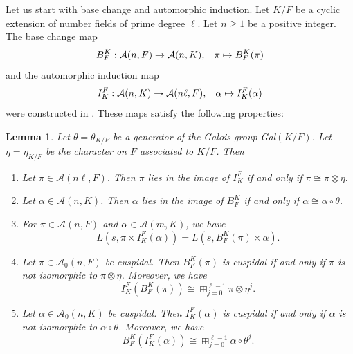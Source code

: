 \documentclass[12pt]{amsart}
\newcommand{\cA}{\mathcal{A}}
\newtheorem{lemma}{Lemma}[section]
\begin{document}
Let us start with base change and automorphic induction. Let $K/F$ be a cyclic extension of number fields of prime degree $\ell$. Let $n \geq 1$ be a positive integer. The base change map 
\begin{equation*}
    B_F^K:\cA(n,F) \to \cA(n,K), \hspace{3mm} \pi \mapsto B_F^K(\pi)
\end{equation*}
and the automorphic induction map 
\begin{equation*}
    I_K^F:\cA(n,K) \to \cA(n\ell,F), \hspace{3mm} \alpha \mapsto I_K^F(\alpha)
\end{equation*}
were constructed in \cite{ArthurClozel1989}. These maps satisfy the following properties: 

\begin{lemma}\label{base change and automporphic induction}
    Let $\theta = \theta_{K/F}$ be a generator of the Galois group Gal$(K/F)$. Let $\eta = \eta_{K/F}$ be the character on $F$ associated to $K/F$. Then 
    \begin{enumerate}
        \item Let $\pi \in \cA(n\ell,F)$. Then $\pi$ lies in the image of $I_K^F$ if and only if $\pi \cong \pi \otimes \eta$.
        \item Let $\alpha \in \cA(n,K)$. Then $\alpha$ lies in the image of $B_F^K$ if and only if $\alpha \cong \alpha \circ \theta$.
        \item For $\pi \in \cA(n,F)$ and $\alpha \in \cA(m,K)$, we have 
        \begin{equation*}
            L(s,\pi \times I_K^F(\alpha)) = L(s,B_F^K(\pi) \times \alpha).
        \end{equation*}
        \item Let $\pi \in \cA_0(n,F)$ be cuspidal. Then $B_F^K(\pi)$ is cuspidal if and only if $\pi$ is not isomorphic to $\pi \otimes \eta$. Moreover, we have 
        $$I_K^F(B_F^K(\pi)) \cong \boxplus_{j=0}^{\ell-1} \pi \otimes \eta^j.$$
        \item Let $\alpha \in \cA_0(n,K)$ be cuspidal. Then $I_K^F(\alpha)$ is cuspidal if and only if $\alpha$ is not isomorphic to $\alpha \circ \theta$. Moreover, we have 
        $$B_F^K(I_K^F(\alpha)) \cong \boxplus_{j=0}^{\ell-1} \alpha \circ \theta^j.$$
    \end{enumerate}
\end{lemma}
\end{document}
